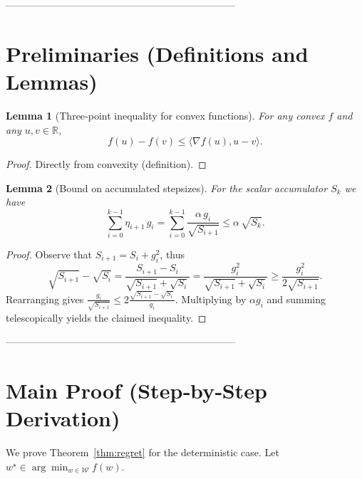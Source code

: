\documentclass{article}
\newtheorem{lemma}{Lemma}
\begin{document}
---------------------------------------------------------------------

\section*{Preliminaries (Definitions and Lemmas)}

\begin{lemma}[Three‑point inequality for convex functions]\label{lem:three}
For any convex $f$ and any $u,v\in\mathbb{R}$,
\[
f(u)-f(v) \le \langle \nabla f(u), u-v\rangle .
\]
\end{lemma}
\begin{proof}
Directly from convexity (definition). \qedhere
\end{proof}

\begin{lemma}[Bound on accumulated stepsizes]\label{lem:steps}
For the scalar accumulator $S_k$ we have
\[
\sum_{i=0}^{k-1}\eta_{i+1}\, g_i
   = \sum_{i=0}^{k-1}\frac{\alpha\,g_i}{\sqrt{S_{i+1}}}
   \le \alpha\,\sqrt{S_k}.
\]
\end{lemma}
\begin{proof}
Observe that $S_{i+1}=S_i+g_i^{2}$, thus
\[
\sqrt{S_{i+1}}-\sqrt{S_i}
   = \frac{S_{i+1}-S_i}{\sqrt{S_{i+1}}+\sqrt{S_i}}
   = \frac{g_i^{2}}{\sqrt{S_{i+1}}+\sqrt{S_i}}
   \ge \frac{g_i^{2}}{2\sqrt{S_{i+1}}}.
\]
Rearranging gives $ \frac{g_i}{\sqrt{S_{i+1}}}\le 2\frac{\sqrt{S_{i+1}}-\sqrt{S_i}}{g_i}$.
Multiplying by $\alpha g_i$ and summing telescopically yields the claimed
inequality. \qedhere
\end{proof}

---------------------------------------------------------------------

\section*{Main Proof (Step‑by‑Step Derivation)}

We prove Theorem~\ref{thm:regret} for the deterministic case.
Let $w^\star\in\arg\min_{w\in\mathcal{W}}f(w)$.
\end{document}
